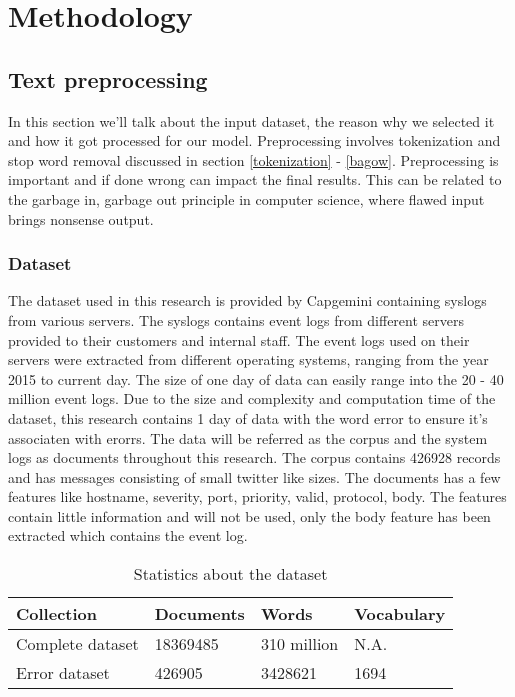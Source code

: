 \chapter{Methodology}  \label{ch:methodology}

\section{Text preprocessing}\label{methodology:Text preprocessing}
In this section we'll talk about the input dataset, the reason why we selected it and how it got processed for our model. Preprocessing involves tokenization and stop word removal discussed in section \ref{tokenization} - \ref{bagow}. Preprocessing is important and if done wrong can impact the final results. This can be related to the garbage in, garbage out principle in computer science, where flawed input brings nonsense output. 

\subsection{Dataset}
The dataset used in this research is provided by Capgemini containing syslogs from various servers. The syslogs contains event logs from different servers provided to their customers and internal staff. The event logs used on their servers were extracted from different operating systems, ranging from the year 2015 to current day. The size of one day of data can easily range into the 20 - 40 million event logs. Due to the size and complexity and computation time of the dataset, this research contains 1 day of data with the word error to ensure it's associaten with erorrs.
The data will be referred as the corpus and the system logs as documents throughout this research. The corpus contains 426928 records and has messages consisting of small twitter like sizes. The documents has a few features like hostname, severity, port, priority, valid, protocol, body. The features contain little information and will not be used, only the body feature has been extracted which contains the event log.


\begin{table}[h]
\centering
 \begin{tabular}{|l|l|l|l|} 
 \hline
 Collection & Documents & Words & Vocabulary  \\ [0.5ex] 
 \hline\hline
 Complete dataset & 18369485 & 310 million & N.A.  \\ 
 Error dataset & 426905 & 3428621 & 1694 \\
 \hline
 \end{tabular}
\caption{Statistics about the dataset}
\label{tab:table1}
\end{table}


